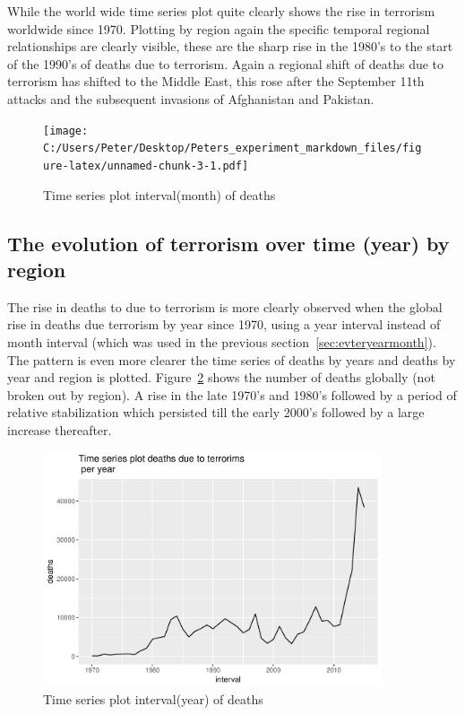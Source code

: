While the world wide time series plot quite clearly shows the rise in
terrorism worldwide since 1970. Plotting by region again the specific
temporal regional relationships are clearly visible, these are the sharp
rise in the 1980's to the start of the 1990's of deaths due to
terrorism. Again a regional shift of deaths due to terrorism has shifted
to the Middle East, this rose after the September 11th attacks and the
subsequent invasions of Afghanistan and Pakistan.

\begin{figure}[t]
\texttt{[image: C:/Users/Peter/Desktop/Peters\_experiment\_markdown\_files/figure-latex/unnamed-chunk-3-1.pdf]}
\caption{Time series plot interval(month) of deaths}
\label{fig:tseriesmonth1}
\centering
\end{figure}

\subsection{The evolution of terrorism over time (year) by
region}

The rise in deaths to due to terrorism is more clearly observed when the global rise in deaths due terrorism by year since 1970, using a year interval instead of month interval (which was used in the previous section~\ref{sec:evteryearmonth}). The pattern is even more clearer the time series of deaths by years and deaths by year and region is plotted. Figure~\ref{fig:tseriesyear1} shows the number of deaths globally (not broken out by region). A rise in the late 1970's and 1980's followed by a period of relative stabilization  which persisted till the early 2000's followed by a large increase thereafter.

\begin{figure}[t]
\includegraphics[width=10cm]{Peters_experiment_markdown_files/figure-latex/unnamed-chunk-4-1.pdf}
\caption{Time series plot interval(year) of deaths}
\label{fig:tseriesyear1}
\centering
\end{figure}

